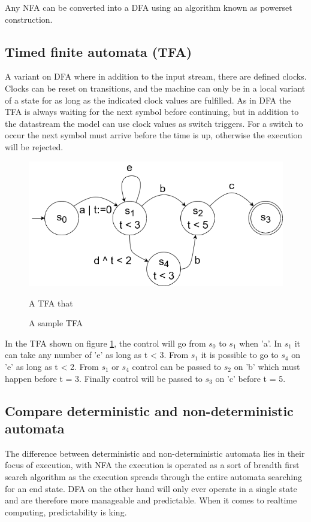 Any NFA can be converted into a DFA using an algorithm known as powerset construction.

\subsection{Timed finite automata (TFA)}
A variant on DFA where in addition to the input stream, there are defined clocks. Clocks can be reset on transitions, and the machine can only be in a local variant of a state for as long as the indicated clock values are fulfilled. As in DFA the TFA is always waiting for the next symbol before continuing, but in addition to the datastream the model can use clock values as switch triggers. For a switch to occur the next symbol must arrive before the time is up, otherwise the execution will be rejected. 

\begin{figure}[h!]\label{}
    \centering
    \includegraphics[scale=0.5]{realTimeComputing/fig/TFA.png}
    \caption{A TFA that }
    \caption{A sample TFA}
    \label{fig:tfaSample}
\end{figure}

In the TFA shown on figure \ref{fig:tfaSample}, the control will go from $s_0$ to $s_1$ when 'a'. In $s_1$ it can take any number of 'e' as long as t < 3. From $s_1$ it is possible to go to $s_4$ on 'e' as long as t < 2. From $s_1$ or $s_4$ control can be passed to $s_2$ on 'b' which must happen before t = 3. Finally control will be passed to $s_3$ on 'c' before t = 5.

\subsection{Compare deterministic and non-deterministic automata}
The difference between deterministic and non-deterministic automata lies in their focus of execution, with NFA the execution is operated as a sort of breadth first search algorithm as the execution spreads through the entire automata searching for an end state. DFA on the other hand will only ever operate in a single state and are therefore more manageable and predictable. When it comes to realtime computing, predictability is king.


